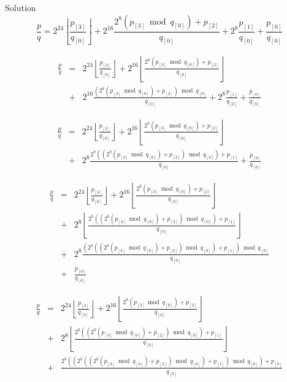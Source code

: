 \begin{vworkexampleparsection}{Solution}
\begin{equation}
\label{eq:ex:ccil0:sidv0:sldm0:01:006}
\frac{p}{q} 
=
2^{24} \left\lfloor{\frac{p_{[3]}}{q_{[0]}}}\right\rfloor
+
2^{16} \frac{2^8 (p_{[3]} \bmod q_{[0]}) + p_{[2]}}{q_{[0]}}
+
2^{8} \frac{p_{[1]}}{q_{[0]}}
+
\frac{p_{[0]}}{q_{[0]}}
\end{equation}

\begin{eqnarray}
\label{eq:ex:ccil0:sidv0:sldm0:01:007}
\frac{p}{q} & = & 2^{24} \left\lfloor{\frac{p_{[3]}}{q_{[0]}}}\right\rfloor
+
2^{16} \left\lfloor{\frac{2^8 (p_{[3]} \bmod q_{[0]}) + p_{[2]}}{q_{[0]}}}\right\rfloor \\
\nonumber & + &
2^{16} \frac{(2^8 (p_{[3]} \bmod q_{[0]}) + p_{[2]}) \bmod q_{[0]}}{q_{[0]}}
+
2^{8} \frac{p_{[1]}}{q_{[0]}}
+
\frac{p_{[0]}}{q_{[0]}}
\end{eqnarray}

\begin{eqnarray}
\label{eq:ex:ccil0:sidv0:sldm0:01:008}
\frac{p}{q} & = & 2^{24} \left\lfloor{\frac{p_{[3]}}{q_{[0]}}}\right\rfloor
+
2^{16} \left\lfloor{\frac{2^8 (p_{[3]} \bmod q_{[0]}) + p_{[2]}}{q_{[0]}}}\right\rfloor \\
\nonumber & + &
2^{8} \frac{2^8((2^8 (p_{[3]} \bmod q_{[0]}) + p_{[2]}) \bmod q_{[0]}) + p_{[1]}}{q_{[0]}}
+
\frac{p_{[0]}}{q_{[0]}}
\end{eqnarray}

\begin{eqnarray}
\nonumber\frac{p}{q} & = & 2^{24} \left\lfloor{\frac{p_{[3]}}{q_{[0]}}}\right\rfloor
+
2^{16} \left\lfloor{\frac{2^8 (p_{[3]} \bmod q_{[0]}) + p_{[2]}}{q_{[0]}}}\right\rfloor \\
\label{eq:ex:ccil0:sidv0:sldm0:01:009}
 & + &
2^{8} \left\lfloor{\frac{2^8((2^8 (p_{[3]} \bmod q_{[0]}) + p_{[2]}) \bmod q_{[0]}) + p_{[1]}}{q_{[0]}}}\right\rfloor \\
\nonumber & + &
2^{8} \frac{(2^8((2^8 (p_{[3]} \bmod q_{[0]}) + p_{[2]}) \bmod q_{[0]}) + p_{[1]}) \bmod q_{[0]}}{q_{[0]}} \\
\nonumber & + &
\frac{p_{[0]}}{q_{[0]}}
\end{eqnarray}

\begin{eqnarray}
\nonumber\frac{p}{q} & = & 2^{24} \left\lfloor{\frac{p_{[3]}}{q_{[0]}}}\right\rfloor
+
2^{16} \left\lfloor{\frac{2^8 (p_{[3]} \bmod q_{[0]}) + p_{[2]}}{q_{[0]}}}\right\rfloor \\
\label{eq:ex:ccil0:sidv0:sldm0:01:010}
 & + &
2^{8} \left\lfloor{\frac{2^8((2^8 (p_{[3]} \bmod q_{[0]}) + p_{[2]}) \bmod q_{[0]}) + p_{[1]}}{q_{[0]}}}\right\rfloor \\
\nonumber & + &
\frac{2^8((2^8((2^8 (p_{[3]} \bmod q_{[0]}) + p_{[2]}) \bmod q_{[0]}) + p_{[1]}) \bmod q_{[0]}) + p_{[0]}}{q_{[0]}}
\end{eqnarray}


\end{vworkexampleparsection}
